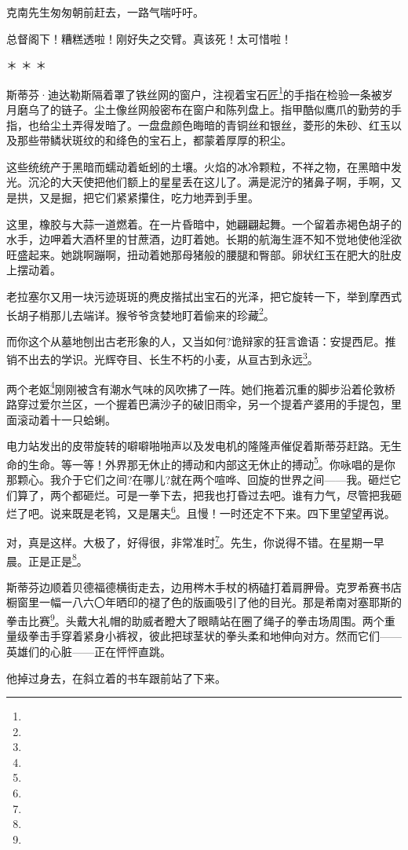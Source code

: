 \par 克南先生匆匆朝前赶去，一路气喘吁吁。
\par 总督阁下！糟糕透啦！刚好失之交臂。真该死！太可惜啦！
\par ＊ ＊ ＊
\par 斯蒂芬·迪达勒斯隔着罩了铁丝网的窗户，注视着宝石匠\footnote{}的手指在检验一条被岁月磨乌了的链子。尘土像丝网般密布在窗户和陈列盘上。指甲酷似鹰爪的勤劳的手指，也给尘土弄得发暗了。一盘盘颜色晦暗的青铜丝和银丝，菱形的朱砂、红玉以及那些带鳞状斑纹的和绛色的宝石上，都蒙着厚厚的积尘。
\par 这些统统产于黑暗而蠕动着蚯蚓的土壤。火焰的冰冷颗粒，不祥之物，在黑暗中发光。沉沦的大天使把他们额上的星星丢在这儿了。满是泥泞的猪鼻子啊，手啊，又是拱，又是掘，把它们紧紧攥住，吃力地弄到手里。
\par 这里，橡胶与大蒜一道燃着。在一片昏暗中，她翩翩起舞。一个留着赤褐色胡子的水手，边呷着大酒杯里的甘蔗酒，边盯着她。长期的航海生涯不知不觉地使他淫欲旺盛起来。她跳啊蹦啊，扭动着她那母猪般的腰腿和臀部。卵状红玉在肥大的肚皮上摆动着。
\par 老拉塞尔又用一块污迹斑斑的麂皮揩拭出宝石的光泽，把它旋转一下，举到摩西式长胡子梢那儿去端详。猴爷爷贪婪地盯着偷来的珍藏\footnote{}。
\par 而你这个从墓地刨出古老形象的人，又当如何?诡辩家的狂言谵语：安提西尼。推销不出去的学识。光辉夺目、长生不朽的小麦，从亘古到永远\footnote{}。
\par 两个老妪\footnote{}刚刚被含有潮水气味的风吹拂了一阵。她们拖着沉重的脚步沿着伦敦桥路穿过爱尔兰区，一个握着巴满沙子的破旧雨伞，另一个提着产婆用的手提包，里面滚动着十一只蛤蜊。
\par 电力站发出的皮带旋转的噼噼啪啪声以及发电机的隆隆声催促着斯蒂芬赶路。无生命的生命。等一等！外界那无休止的搏动和内部这无休止的搏动\footnote{}。你咏唱的是你那颗心。我介于它们之间?在哪儿?就在两个喧哗、回旋的世界之间——我。砸烂它们算了，两个都砸烂。可是一拳下去，把我也打昏过去吧。谁有力气，尽管把我砸烂了吧。说来既是老鸨，又是屠夫\footnote{}。且慢！一时还定不下来。四下里望望再说。
\par 对，真是这样。大极了，好得很，非常准时\footnote{}。先生，你说得不错。在星期一早晨。正是正是\footnote{}。
\par 斯蒂芬边顺着贝德福德横街走去，边用梣木手杖的柄磕打着肩胛骨。克罗希赛书店橱窗里一幅一八六〇年晒印的褪了色的版画吸引了他的目光。那是希南对塞耶斯的拳击比赛\footnote{}。头戴大礼帽的助威者瞪大了眼睛站在圈了绳子的拳击场周围。两个重量级拳击手穿着紧身小裤衩，彼此把球茎状的拳头柔和地伸向对方。然而它们——英雄们的心脏——正在怦怦直跳。
\par 他掉过身去，在斜立着的书车跟前站了下来。

